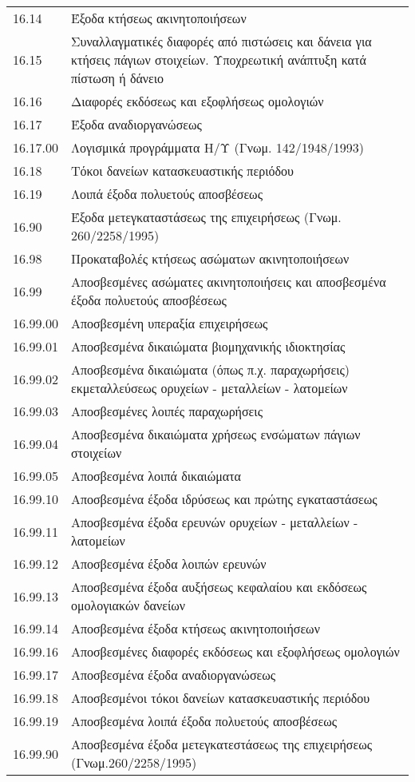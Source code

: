 \documentclass[A4,10pt,greek]{book}
\begin{document}
\begin{tabularx}{\linewidth}{lX}
16.14 & Έξοδα κτήσεως ακινητοποιήσεων\\
16.15 & Συναλλαγματικές διαφορές από πιστώσεις και δάνεια για κτήσεις πάγιων στοιχείων. Υποχρεωτική ανάπτυξη κατά πίστωση ή δάνειο\\
16.16 & Διαφορές εκδόσεως και εξοφλήσεως ομολογιών\\
16.17 & Έξοδα αναδιοργανώσεως\\
16.17.00 & Λογισμικά προγράμματα Η/Υ (Γνωμ. 142/1948/1993)\\
16.18 & Τόκοι δανείων κατασκευαστικής περιόδου\\
16.19 & Λοιπά έξοδα πολυετούς αποσβέσεως\\
16.90 & Έξοδα μετεγκαταστάσεως της επιχειρήσεως (Γνωμ. 260/2258/1995)\\
16.98 & Προκαταβολές κτήσεως ασώματων ακινητοποιήσεων\\
16.99 & Αποσβεσμένες ασώματες ακινητοποιήσεις και αποσβεσμένα έξοδα πολυετούς αποσβέσεως\\
16.99.00 & Αποσβεσμένη υπεραξία επιχειρήσεως\\
16.99.01 & Αποσβεσμένα δικαιώματα βιομηχανικής ιδιοκτησίας\\
16.99.02 & Αποσβεσμένα δικαιώματα (όπως π.χ. παραχωρήσεις) εκμεταλλεύσεως ορυχείων - μεταλλείων - λατομείων\\
16.99.03 & Αποσβεσμένες λοιπές παραχωρήσεις\\
16.99.04 & Αποσβεσμένα δικαιώματα χρήσεως ενσώματων πάγιων στοιχείων\\
16.99.05 & Αποσβεσμένα λοιπά δικαιώματα\\
16.99.10 & Αποσβεσμένα έξοδα ιδρύσεως και πρώτης εγκαταστάσεως\\
16.99.11 & Αποσβεσμένα έξοδα ερευνών ορυχείων - μεταλλείων - λατομείων\\
16.99.12 & Αποσβεσμένα έξοδα λοιπών ερευνών\\
16.99.13 & Αποσβεσμένα έξοδα αυξήσεως κεφαλαίου και εκδόσεως ομολογιακών δανείων\\
16.99.14 & Αποσβεσμένα έξοδα κτήσεως ακινητοποιήσεων\\
16.99.16 & Αποσβεσμένες διαφορές εκδόσεως και εξοφλήσεως ομολογιών\\
16.99.17 & Αποσβεσμένα έξοδα αναδιοργανώσεως\\
16.99.18 & Αποσβεσμένοι τόκοι δανείων κατασκευαστικής περιόδου\\
16.99.19 & Αποσβεσμένα λοιπά έξοδα πολυετούς αποσβέσεως\\
16.99.90 & Αποσβεσμένα έξοδα μετεγκατεστάσεως της επιχειρήσεως (Γνωμ.260/2258/1995)\\

\end{tabularx}
\end{document}
